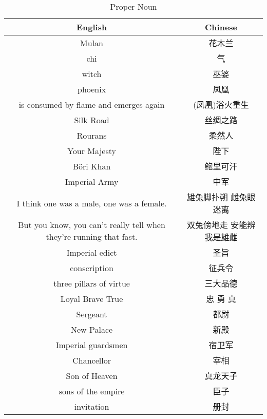 \begin{table}[!ht]
    \centering
    \caption{Proper Noun}
    \begin{tabular}{|c|c|}
    \hline
    \textbf{English} & \textbf{Chinese} \\ \hline
        Mulan & 花木兰 \\ \hline
        chi & 气 \\ \hline
        witch & 巫婆 \\ \hline
        phoenix & 凤凰 \\ \hline
        is consumed by flame and emerges again & (凤凰)浴火重生 \\ \hline
        Silk Road & 丝绸之路 \\ \hline
        Rourans & 柔然人 \\ \hline
        Your Majesty & 陛下 \\ \hline
        Böri Khan & 鲍里可汗 \\ \hline
        Imperial Army & 中军 \\ \hline
        I think one was a male, one was a female. & 雄兔脚扑朔  雌兔眼迷离\\
        But you know, you can't really tell when they're running that fast. &双兔傍地走 安能辨我是雄雌 \\ \hline
        Imperial edict & 圣旨 \\ \hline
        conscription & 征兵令 \\ \hline
        three pillars of virtue & 三大品德 \\ \hline
        Loyal Brave True & 忠 勇 真 \\ \hline
        Sergeant & 都尉 \\ \hline
        New Palace & 新殿 \\ \hline
        Imperial guardsmen & 宿卫军 \\ \hline
        Chancellor & 宰相 \\ \hline
        Son of Heaven & 真龙天子 \\ \hline
        sons of the empire & 臣子 \\ \hline
        invitation & 册封 \\ \hline
    \end{tabular}
\end{table}

